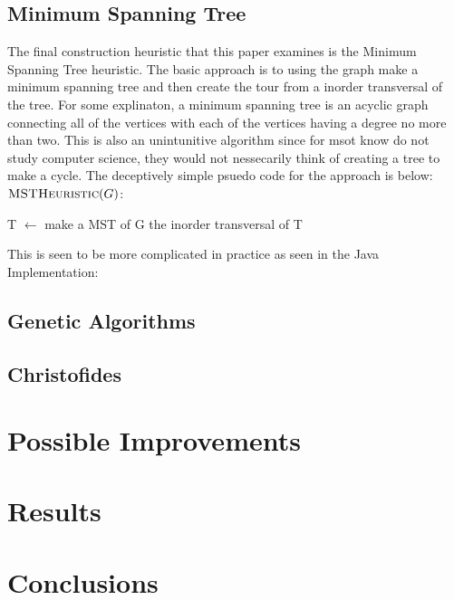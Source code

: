 \documentclass[midd]{thesis}
\newcommand{\tab}{\hspace*{2em}}
\begin{document}
\section{Minimum Spanning Tree}
\tab The final construction heuristic that this paper examines is the Minimum Spanning Tree heuristic. The basic approach is to using the graph make a minimum spanning tree and then create the tour from a inorder transversal of the tree. For some explinaton, a minimum spanning tree is an acyclic graph connecting all of the vertices with each of the vertices having a degree no more than two. This is also an unintunitive algorithm since for msot know do not study computer science, they would not nessecarily think of creating a tree to make a cycle. The deceptively simple psuedo code for the approach is below:\\

$\textnormal{\scshape MSTHeuristic}(G)$:
\begin{codebox}
\li T $\gets$ make a MST of G
\li \Return the inorder transversal of T
\end{codebox}
This is seen to be more complicated in practice as seen in the Java Implementation: 


\section{Genetic Algorithms}

\section{Christofides}


\chapter{Possible Improvements}
\chapter{Results}
\chapter{Conclusions}


\end{document}
